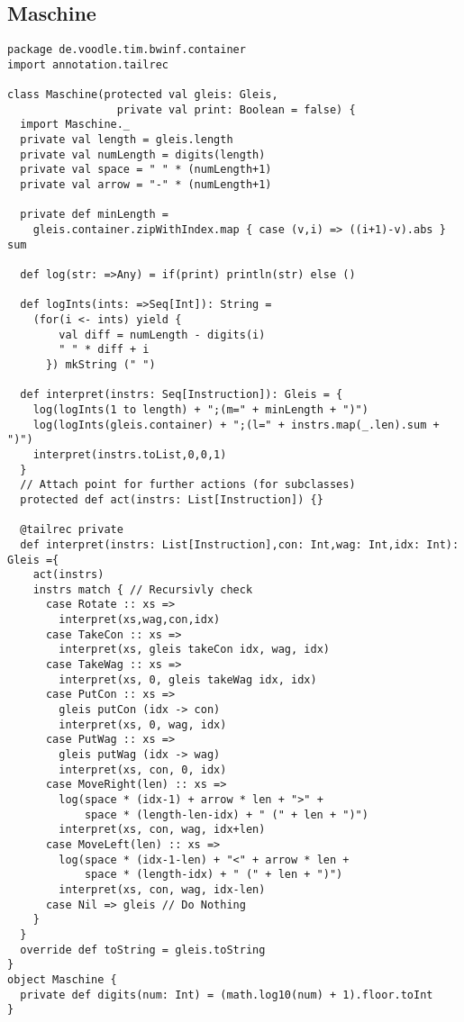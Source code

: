 \subsection{Maschine}
\begin{lstlisting}
package de.voodle.tim.bwinf.container
import annotation.tailrec

class Maschine(protected val gleis: Gleis,
                 private val print: Boolean = false) {
  import Maschine._
  private val length = gleis.length
  private val numLength = digits(length)
  private val space = " " * (numLength+1)
  private val arrow = "-" * (numLength+1)

  private def minLength =
    gleis.container.zipWithIndex.map { case (v,i) => ((i+1)-v).abs } sum

  def log(str: =>Any) = if(print) println(str) else ()
  
  def logInts(ints: =>Seq[Int]): String =
    (for(i <- ints) yield {
        val diff = numLength - digits(i)
        " " * diff + i
      }) mkString (" ")

  def interpret(instrs: Seq[Instruction]): Gleis = {
    log(logInts(1 to length) + ";(m=" + minLength + ")")
    log(logInts(gleis.container) + ";(l=" + instrs.map(_.len).sum + ")")
    interpret(instrs.toList,0,0,1)
  }
  // Attach point for further actions (for subclasses)
  protected def act(instrs: List[Instruction]) {}
  
  @tailrec private
  def interpret(instrs: List[Instruction],con: Int,wag: Int,idx: Int): Gleis ={
    act(instrs)
    instrs match { // Recursivly check
      case Rotate :: xs =>
        interpret(xs,wag,con,idx)
      case TakeCon :: xs =>
        interpret(xs, gleis takeCon idx, wag, idx)
      case TakeWag :: xs =>
        interpret(xs, 0, gleis takeWag idx, idx)
      case PutCon :: xs =>
        gleis putCon (idx -> con)
        interpret(xs, 0, wag, idx)
      case PutWag :: xs =>
        gleis putWag (idx -> wag)
        interpret(xs, con, 0, idx)
      case MoveRight(len) :: xs =>
        log(space * (idx-1) + arrow * len + ">" +
            space * (length-len-idx) + " (" + len + ")")
        interpret(xs, con, wag, idx+len)
      case MoveLeft(len) :: xs =>
        log(space * (idx-1-len) + "<" + arrow * len +
            space * (length-idx) + " (" + len + ")")
        interpret(xs, con, wag, idx-len)
      case Nil => gleis // Do Nothing
    }
  }
  override def toString = gleis.toString
}
object Maschine {
  private def digits(num: Int) = (math.log10(num) + 1).floor.toInt
}
\end{lstlisting}
\clearpage
